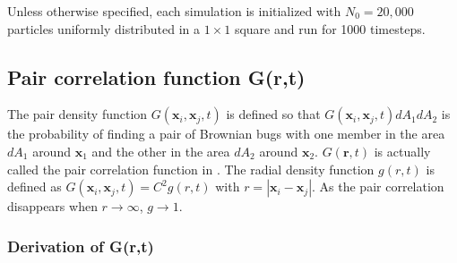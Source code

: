Unless otherwise specified, each simulation is initialized with $N_0=20,000$ particles uniformly distributed in a $1\times 1$ square and run for 1000 timesteps. 
 
% 
% 
% 
\subsection*{Pair correlation function G(r,t)}

The pair density function $G(\boldsymbol{x}_i,\boldsymbol{x}_j,t)$ is defined so that $G(\boldsymbol{x}_i,\boldsymbol{x}_j,t)dA_1dA_2$ is the probability of finding a pair of Brownian bugs with one member in the area $dA_1$ around $\boldsymbol{x}_1$ and the other in the area $dA_2$ around $\boldsymbol{x}_2$. $G(\boldsymbol{r},t)$ is actually called the pair correlation function in \cite{young_reproductive_2001}. The radial density function $g(r,t)$ is defined as $G(\boldsymbol{x}_i,\boldsymbol{x}_j,t)=C^2g(r,t)$ with $r=|\boldsymbol{x}_i-\boldsymbol{x}_j|$. As the pair correlation disappears when $r\rightarrow\infty$, $g\rightarrow 1$. \\

\subsubsection*{Derivation of G(r,t)}

